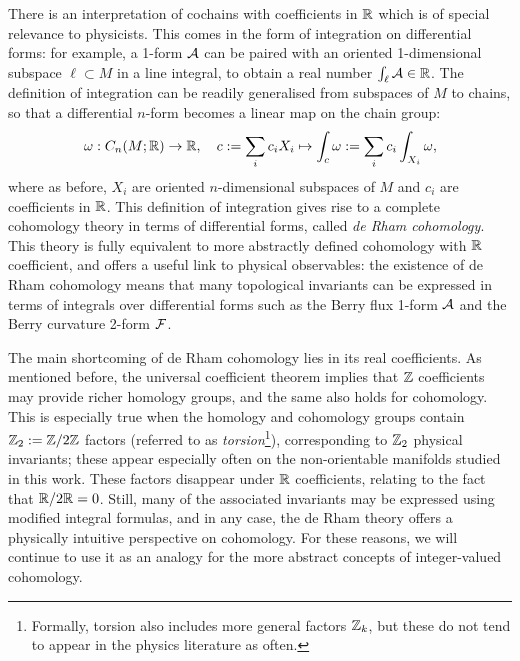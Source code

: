 There is an interpretation of cochains with coefficients in $\mathbb{R}$ which is of special relevance to physicists. This comes in the form of integration on differential forms: for example, a 1-form $\mathcal{A}$ can be paired with an oriented 1-dimensional subspace $\ell\subset M$ in a line integral, to obtain a real number $\int_{\ell}\mathcal{A}\in\mathbb{R}$. The definition of integration can be readily generalised from subspaces of $M$ to chains, so that a differential $n$-form becomes a linear map on the chain group:
\begin{equation*}
	\omega: C_n(M;\mathbb{R})\to\mathbb{R},\quad c := \sum_i c_i X_i \mapsto \int_c \omega := \sum_i c_i \int_{X_i}\omega,
\end{equation*}
where as before, $X_i$ are oriented $n$-dimensional subspaces of $M$ and $c_i$ are coefficients in $\mathbb{R}$. This definition of integration gives rise to a complete cohomology theory in terms of differential forms, called \emph{de Rham cohomology}. This theory is fully equivalent to more abstractly defined cohomology with $\mathbb{R}$ coefficient, and offers a useful link to physical observables: the existence of de Rham cohomology means that many topological invariants can be expressed in terms of integrals over differential forms such as the Berry flux 1-form $\mathcal{A}$ and the Berry curvature 2-form $\mathcal{F}$.

The main shortcoming of de Rham cohomology lies in its real coefficients. As mentioned before, the universal coefficient theorem implies that $\mathbb{Z}$ coefficients may provide richer homology groups, and the same also holds for cohomology. This is especially true when the homology and cohomology groups contain $\mathbb{Z}_2 := \mathbb{Z}/2\mathbb{Z}$ factors (referred to as \emph{torsion}\footnote{
	Formally, torsion also includes more general factors $\mathbb{Z}_k$, but these do not tend to appear in the physics literature as often.}),
corresponding to $\mathbb{Z}_2$ physical invariants; these appear especially often on the non-orientable manifolds studied in this work. These factors disappear under $\mathbb{R}$ coefficients, relating to the fact that $\mathbb{R}/2\mathbb{R} = 0$. Still, many of the associated invariants may be expressed using modified integral formulas, and in any case, the de Rham theory offers a physically intuitive perspective on cohomology. For these reasons, we will continue to use it as an analogy for the more abstract concepts of integer-valued cohomology.

